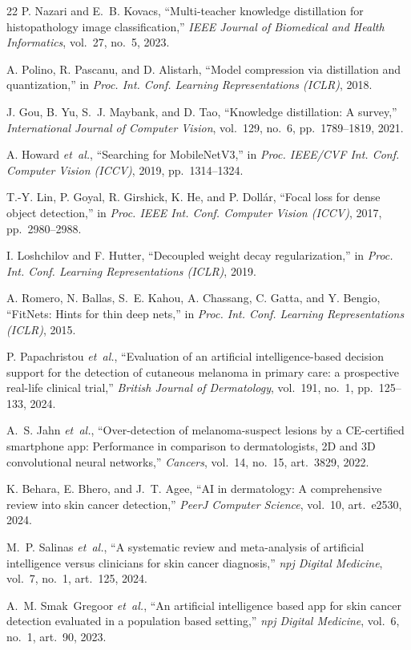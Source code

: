 \documentclass[conference]{IEEEtran}
\begin{document}
\begin{thebibliography}{22}
P. Nazari and E.~B. Kovacs, ``Multi-teacher knowledge distillation for histopathology image classification,'' \emph{IEEE Journal of Biomedical and Health Informatics}, vol.~27, no.~5, 2023.

A. Polino, R. Pascanu, and D. Alistarh, ``Model compression via distillation and quantization,'' in \emph{Proc. Int. Conf. Learning Representations (ICLR)}, 2018.

J. Gou, B. Yu, S.~J. Maybank, and D. Tao, ``Knowledge distillation: A survey,'' \emph{International Journal of Computer Vision}, vol.~129, no.~6, pp.~1789--1819, 2021.

A. Howard \emph{et~al.}, ``Searching for MobileNetV3,'' in \emph{Proc. IEEE/CVF Int. Conf. Computer Vision (ICCV)}, 2019, pp.~1314--1324.

T.-Y. Lin, P. Goyal, R. Girshick, K. He, and P. Doll\'{a}r, ``Focal loss for dense object detection,'' in \emph{Proc. IEEE Int. Conf. Computer Vision (ICCV)}, 2017, pp.~2980--2988.

I. Loshchilov and F. Hutter, ``Decoupled weight decay regularization,'' in \emph{Proc. Int. Conf. Learning Representations (ICLR)}, 2019.

A. Romero, N. Ballas, S.~E. Kahou, A. Chassang, C. Gatta, and Y. Bengio, ``FitNets: Hints for thin deep nets,'' in \emph{Proc. Int. Conf. Learning Representations (ICLR)}, 2015.

P. Papachristou \emph{et~al.}, ``Evaluation of an artificial intelligence-based decision support for the detection of cutaneous melanoma in primary care: a prospective real-life clinical trial,'' \emph{British Journal of Dermatology}, vol.~191, no.~1, pp.~125--133, 2024.

A.~S. Jahn \emph{et~al.}, ``Over-detection of melanoma-suspect lesions by a CE-certified smartphone app: Performance in comparison to dermatologists, 2D and 3D convolutional neural networks,'' \emph{Cancers}, vol.~14, no.~15, art.~3829, 2022.

K. Behara, E. Bhero, and J.~T. Agee, ``AI in dermatology: A comprehensive review into skin cancer detection,'' \emph{PeerJ Computer Science}, vol.~10, art.~e2530, 2024.

M.~P. Salinas \emph{et~al.}, ``A systematic review and meta-analysis of artificial intelligence versus clinicians for skin cancer diagnosis,'' \emph{npj Digital Medicine}, vol.~7, no.~1, art.~125, 2024.

A.~M. Smak~Gregoor \emph{et~al.}, ``An artificial intelligence based app for skin cancer detection evaluated in a population based setting,'' \emph{npj Digital Medicine}, vol.~6, no.~1, art.~90, 2023.

\end{thebibliography}
\end{document}
